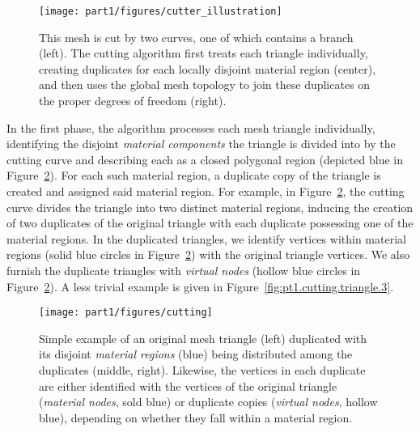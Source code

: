 \setlength{\figurewidth}{\columnwidth}
\begin{figure}[htbp]
\begin{center}
\texttt{[image: part1/figures/cutter\_illustration]}
\caption{This mesh is cut by two curves, one of which contains a branch (left). The cutting algorithm first treats each triangle individually, creating duplicates for each locally disjoint material region (center), and then uses the global mesh topology to join these duplicates on the proper degrees of freedom (right). }
\label{fig:pt1.cutting.example}
\end{center}
\end{figure}

In the first phase, the algorithm processes each mesh triangle individually, identifying the disjoint \emph{material components} the triangle is divided into by the cutting curve and describing each as a closed polygonal region (depicted blue in Figure~\ref{fig:pt1.cutting.triangle.2}). For each such material region, a duplicate copy of the triangle is created and assigned said material region. For example, in Figure~\ref{fig:pt1.cutting.triangle.2}, the cutting curve divides the triangle into two distinct material regions, inducing the creation of two duplicates of the original triangle with each duplicate possessing one of the material regions. In the duplicated triangles, we identify vertices within material regions (solid blue circles in Figure~\ref{fig:pt1.cutting.triangle.2}) with the original triangle vertices. We also furnish the duplicate triangles with \emph{virtual nodes} (hollow blue circles in Figure~\ref{fig:pt1.cutting.triangle.2}). A less trivial example is given in Figure~\ref{fig:pt1.cutting.triangle.3}.

\setlength{\figureheight}{0.25\columnwidth}
\begin{figure}[htbp]
\begin{center}
\texttt{[image: part1/figures/cutting]}
\caption{Simple example of an original mesh triangle (left) duplicated with its disjoint \emph{material regions} (blue) being distributed among the duplicates (middle, right). Likewise, the vertices in each duplicate are either identified with the vertices of the original triangle (\emph{material nodes}, sold blue) or duplicate copies (\emph{virtual nodes}, hollow blue), depending on whether they fall within a material region.}
\label{fig:pt1.cutting.triangle.2}
\end{center}
\end{figure}

